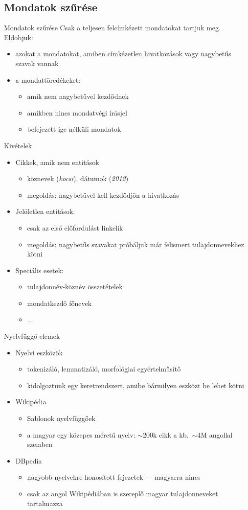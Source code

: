 \documentclass[utf8x,t]{beamer}
\newcommand{\vitem}{\item \vspace{4pt}}
\newcommand{\nagytilde}{$\sim$}
\begin{document}
\subsection{Mondatok szűrése}
\begin{frame}{Mondatok szűrése}
  \bigskip
  Csak a teljesen felcímkézett mondatokat tartjuk meg. Eldobjuk:
  \begin{itemize}
  \item azokat a mondatokat, amiben címkézetlen hivatkozások vagy nagybetűs szavak vannak
  \vitem a mondattöredékeket:
    \begin{itemize}
    \vitem amik nem nagybetűvel kezdődnek
    \vitem amikben nincs mondatvégi írásjel
    \vitem befejezett ige nélküli mondatok %
    \end{itemize}
  \end{itemize}
\end{frame}

\begin{frame}{Kivételek}
  \bigskip
  \begin{itemize}
  \vitem Cikkek, amik nem entitások
    \begin{itemize}
    \vitem köznevek (\textit{kocsi}), dátumok (\textit{2012})
    \vitem megoldás: nagybetűvel kell kezdődjön a hivatkozás
    \end{itemize}
  \vitem Jelöletlen entitások:
    \begin{itemize}
    \vitem csak az első előfordulást linkelik
    \vitem megoldás: nagybetűs szavakat próbáljuk már felismert tulajdonnevekhez kötni
    \end{itemize}
  \vitem Speciális esetek:
    \begin{itemize}
    \vitem tulajdonnév-köznév összetételek
    \vitem mondatkezdő főnevek
    \vitem ...
    \end{itemize}
  \end{itemize}
\end{frame}

\begin{frame}{Nyelvfüggő elemek}
  \begin{itemize}
  \vitem Nyelvi eszközök
    \begin{itemize}
    \vitem tokenizáló, lemmatizáló, morfológiai egyértelműsítő
    \vitem kidolgoztunk egy keretrendszert, amibe bármilyen eszközt be lehet kötni
    \end{itemize}
  \vitem Wikipédia
    \begin{itemize}
    \vitem Sablonok nyelvfüggőek
    \vitem a magyar egy közepes méretű nyelv: \nagytilde 200k cikk a kb.~\nagytilde 4M angollal szemben
    \end{itemize}
  \vitem DBpedia
    \begin{itemize}
    \vitem nagyobb nyelvekre honosított fejezetek --- magyarra nincs
    \vitem csak az angol Wikipédiában is szereplő magyar tulajdonneveket tartalmazza
    \end{itemize}
  \end{itemize}
\end{frame}
\end{document}
